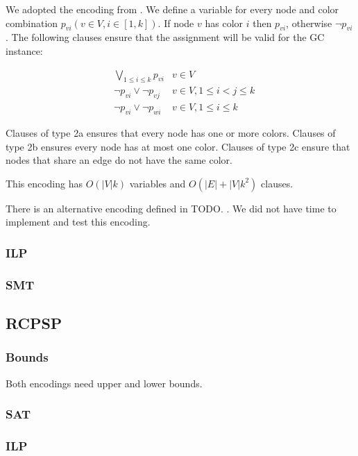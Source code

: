 \documentclass{sig-alternate}
\begin{document}
We adopted the encoding from \cite{cs395tGCtoSAT}. We define a variable for every node and color combination $p_{vi} (v \in V, i \in [1,k])$. If node $v$ has color $i$ then $p_{vi}$, otherwise $\neg p_{vi}$. The following clauses ensure that the assignment will be valid for the GC instance:

\setcounter{equation}{1}
\begin{subequations}
\begin{align}
        & \bigvee_{1 \leq i \leq k} p_{vi}& v \in V\\
        & \neg p_{vi} \lor \neg p_{vj} & v \in V, 1 \leq i < j \leq k \\
        & \neg p_{vi} \lor \neg p_{wi} & v \in V, 1 \leq i \leq k
\end{align}
\end{subequations}

Clauses of type 2a ensures that every node has one or more colors. Clauses of type 2b ensures every node has at most one color. Clauses of type 2c ensure that nodes that share an edge do not have the same color.

This encoding has $O(|V| k)$ variables and $O(|E|+|V| k^2)$ clauses.

There is an alternative encoding defined in TODO. . We did not have time to implement and test this encoding.

\subsubsection*{ILP}
\subsubsection*{SMT}


\subsection{RCPSP}

\subsubsection*{Bounds}

Both encodings need upper and lower bounds.

\subsubsection*{SAT}
\subsubsection*{ILP}
\end{document}
